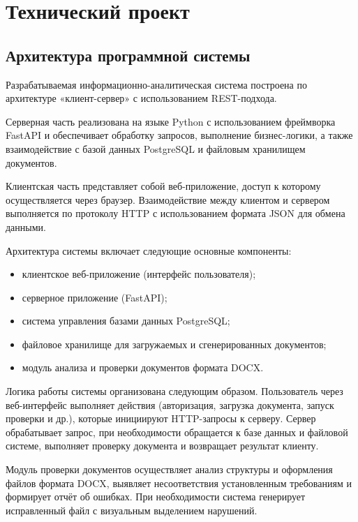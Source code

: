 \section{Технический проект}

\subsection{Архитектура программной системы}

Разрабатываемая информационно-аналитическая система построена по архитектуре «клиент-сервер» с использованием REST-подхода.

Серверная часть реализована на языке Python с использованием фреймворка FastAPI и обеспечивает обработку запросов, выполнение бизнес-логики, а также взаимодействие с базой данных PostgreSQL и файловым хранилищем документов.

Клиентская часть представляет собой веб-приложение, доступ к которому осуществляется через браузер. Взаимодействие между клиентом и сервером выполняется по протоколу HTTP с использованием формата JSON для обмена данными.

Архитектура системы включает следующие основные компоненты:

\begin{itemize}
	\item клиентское веб-приложение (интерфейс пользователя);
	\item серверное приложение (FastAPI);
	\item система управления базами данных PostgreSQL;
	\item файловое хранилище для загружаемых и сгенерированных документов;
	\item модуль анализа и проверки документов формата DOCX.
\end{itemize}

Логика работы системы организована следующим образом. Пользователь через веб-интерфейс выполняет действия (авторизация, загрузка документа, запуск проверки и др.), которые инициируют HTTP-запросы к серверу. Сервер обрабатывает запрос, при необходимости обращается к базе данных и файловой системе, выполняет проверку документа и возвращает результат клиенту.

Модуль проверки документов осуществляет анализ структуры и оформления файлов формата DOCX, выявляет несоответствия установленным требованиям и формирует отчёт об ошибках. При необходимости система генерирует исправленный файл с визуальным выделением нарушений.

